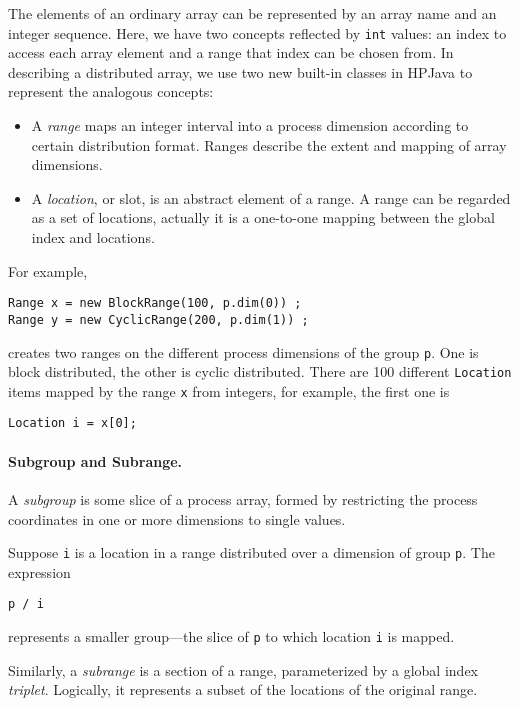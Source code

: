 The elements of an ordinary array can be represented by an array name
and an integer sequence.  Here, we have two concepts reflected by
\texttt{int} values: an index to access each array element and a range
that index can be chosen from.  In describing a distributed
array, we use two new built-in classes in HPJava to represent the
analogous concepts:
\begin{itemize}
\item A {\em range} maps an integer interval into a process dimension
  according to certain distribution format. Ranges describe the extent
  and mapping of array dimensions.

\item A {\em location}, or slot, is an abstract element of a range. A
  range can be regarded as a set of locations, actually it is a
  one-to-one mapping between the global index and locations.
\end{itemize}
For example,
\small
\begin{verbatim}
Range x = new BlockRange(100, p.dim(0)) ;
Range y = new CyclicRange(200, p.dim(1)) ;
\end{verbatim}
\normalsize
creates two ranges on the different process dimensions of the
group \texttt{p}.  One is block distributed, the other is cyclic
distributed.  There are 100 different \texttt{Location}
items mapped by the range \texttt{x} from integers, for example,
the first one is
\small
\begin{verbatim}
Location i = x[0];
\end{verbatim}
\normalsize

\paragraph{Subgroup and Subrange.}

A {\em subgroup} is some slice of a process array, formed by
restricting the process coordinates in one or more dimensions to
single values. 

Suppose {\tt i} is a location in a range distributed over a dimension
of group {\tt p}. The expression
\small
\begin{verbatim}
p / i
\end{verbatim}
\normalsize
represents a smaller group---the slice of {\tt p} to which location
{\tt i} is mapped.  

Similarly, a {\em subrange} is a section of a range, parameterized by
a global index {\em triplet}. Logically, it represents a subset of the
locations of the original range.


